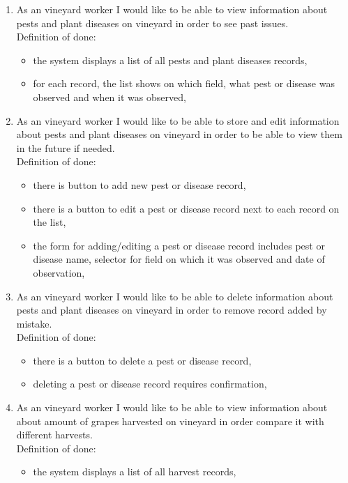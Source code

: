 \begin{enumerate}
	\item As an vineyard worker I would like to be able to view information about pests and plant diseases on vineyard in order to see past issues. \\Definition of done:
	\begin{itemize}
		\item the system displays a list of all pests and plant diseases records,
		\item for each record, the list shows on which field, what pest or disease was observed and when it was observed,
	\end{itemize}
	\item As an vineyard worker I would like to be able to store and edit information about pests and plant diseases on vineyard in order to be able to view them in the future if needed. \\Definition of done:
	\begin{itemize}
		\item there is button to add new pest or disease record,
		\item there is a button to edit a pest or disease record next to each record on the list,
		\item the form for adding/editing a pest or disease record includes pest or disease name, selector for field on which it was observed and date of observation,
	\end{itemize}
	\item As an vineyard worker I would like to be able to delete information about pests and plant diseases on vineyard in order to remove record added by mistake. \\Definition of done:
	\begin{itemize}
		\item there is a button to delete a pest or disease record,
		\item deleting a pest or disease record requires confirmation,
	\end{itemize}
	\item As an vineyard worker I would like to be able to view information about about amount of grapes harvested on vineyard in order compare it with different harvests. \\Definition of done:
	\begin{itemize}
		\item the system displays a list of all harvest records,

\end{itemize}
\end{enumerate}
